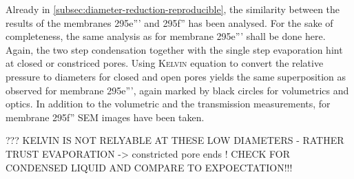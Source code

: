 \documentclass[../thesis.tex]{subfiles}
\begin{document}
            

            Already in \cref{subsec:diameter-reduction-reproducible}, the similarity between the results of the membranes 295e''' and 295f'' has been analysed. For the sake of completeness, the same analysis as for membrane 295e''' shall be done here. Again, the two step condensation together with the single step evaporation hint at closed or constriced pores. Using \textsc{Kelvin} equation to convert the relative pressure to diameters for closed and open pores yields the same superposition as observed for membrane 295e''', again marked by black circles for volumetrics and optics. In addition to the volumetric and the transmission measurements, for membrane 295f'' SEM images have been taken.

            ??? KELVIN IS NOT RELYABLE AT THESE LOW DIAMETERS - RATHER TRUST EVAPORATION -> constricted pore ends ! CHECK FOR CONDENSED LIQUID AND COMPARE TO EXPOECTATION!!!
\end{document}
